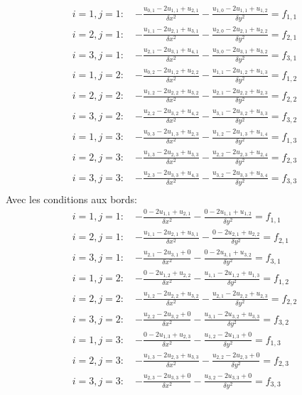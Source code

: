 \documentclass[a4paper,11pt]{article}
\begin{document}
\begin{enumerate}
\[\begin{array}{l}
i=1, j=1:\quad {\displaystyle -\frac{u_{0,1}-2u_{1,1}+u_{2,1}}{\delta x^2}-\frac{u_{1,0}-2u_{1,1}+u_{1,2}}{\delta y^2} }=f_{1,1} \\
i=2, j=1:\quad {\displaystyle -\frac{u_{1,1}-2u_{2,1}+u_{3,1}}{\delta x^2}-\frac{u_{2,0}-2u_{2,1}+u_{2,2}}{\delta y^2} }=f_{2,1} \\
i=3, j=1:\quad {\displaystyle -\frac{u_{2,1}-2u_{3,1}+u_{4,1}}{\delta x^2}-\frac{u_{3,0}-2u_{3,1}+u_{3,2}}{\delta y^2} }=f_{3,1} \\
i=1, j=2:\quad {\displaystyle -\frac{u_{0,2}-2u_{1,2}+u_{2,2}}{\delta x^2}-\frac{u_{1,1}-2u_{1,2}+u_{1,3}}{\delta y^2} }=f_{1,2} \\
i=2, j=2:\quad {\displaystyle -\frac{u_{1,2}-2u_{2,2}+u_{3,2}}{\delta x^2}-\frac{u_{2,1}-2u_{2,2}+u_{2,3}}{\delta y^2} }=f_{2,2} \\
i=3, j=2:\quad {\displaystyle -\frac{u_{2,2}-2u_{3,2}+u_{4,2}}{\delta x^2}-\frac{u_{3,1}-2u_{3,2}+u_{3,3}}{\delta y^2} }=f_{3,2} \\
i=1, j=3:\quad {\displaystyle -\frac{u_{0,3}-2u_{1,3}+u_{2,3}}{\delta x^2}-\frac{u_{1,2}-2u_{1,3}+u_{1,4}}{\delta y^2} }=f_{1,3} \\
i=2, j=3:\quad {\displaystyle -\frac{u_{1,3}-2u_{2,3}+u_{3,3}}{\delta x^2}-\frac{u_{2,2}-2u_{2,3}+u_{2,4}}{\delta y^2} }=f_{2,3} \\
i=3, j=3:\quad {\displaystyle -\frac{u_{2,3}-2u_{3,3}+u_{4,3}}{\delta x^2}-\frac{u_{3,2}-2u_{3,3}+u_{3,4}}{\delta y^2} }=f_{3,3} \\
\end{array}
\]
Avec les conditions aux bords:
\[\begin{array}{l}
i=1, j=1:\quad {\displaystyle -\frac{0-2u_{1,1}+u_{2,1}}{\delta x^2}-\frac{0-2u_{1,1}+u_{1,2}}{\delta y^2} }=f_{1,1} \\
i=2, j=1:\quad {\displaystyle -\frac{u_{1,1}-2u_{2,1}+u_{3,1}}{\delta x^2}-\frac{0-2u_{2,1}+u_{2,2}}{\delta y^2} }=f_{2,1} \\
i=3, j=1:\quad {\displaystyle -\frac{u_{2,1}-2u_{3,1}+0}{\delta x^2}-\frac{0-2u_{3,1}+u_{3,2}}{\delta y^2} }=f_{3,1} \\
i=1, j=2:\quad {\displaystyle -\frac{0-2u_{1,2}+u_{2,2}}{\delta x^2}-\frac{u_{1,1}-2u_{1,2}+u_{1,3}}{\delta y^2} }=f_{1,2} \\
i=2, j=2:\quad {\displaystyle -\frac{u_{1,2}-2u_{2,2}+u_{3,2}}{\delta x^2}-\frac{u_{2,1}-2u_{2,2}+u_{2,3}}{\delta y^2} }=f_{2,2} \\
i=3, j=2:\quad {\displaystyle -\frac{u_{2,2}-2u_{3,2}+0}{\delta x^2}-\frac{u_{3,1}-2u_{3,2}+u_{3,3}}{\delta y^2} }=f_{3,2} \\
i=1, j=3:\quad {\displaystyle -\frac{0-2u_{1,3}+u_{2,3}}{\delta x^2}-\frac{u_{1,2}-2u_{1,3}+0}{\delta y^2} }=f_{1,3} \\
i=2, j=3:\quad {\displaystyle -\frac{u_{1,3}-2u_{2,3}+u_{3,3}}{\delta x^2}-\frac{u_{2,2}-2u_{2,3}+0}{\delta y^2} }=f_{2,3} \\
i=3, j=3:\quad {\displaystyle -\frac{u_{2,3}-2u_{3,3}+0}{\delta x^2}-\frac{u_{3,2}-2u_{3,3}+0}{\delta y^2} }=f_{3,3} \\
\end{array}
\]


\end{enumerate}
\end{document}
